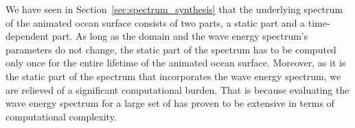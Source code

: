 %
We have seen in Section~\ref{sec:spectrum_synthesis} that the underlying
spectrum of the animated ocean surface consists of two parts, a static part
and a time-dependent part.
As long as the \wavevector domain and the wave energy spectrum's parameters do
not change, the static part of the spectrum has to be computed only once for
the entire lifetime of the animated ocean surface.
Moreover, as it is the static part of the spectrum that incorporates the wave
energy spectrum, we are relieved of a significant computational burden.
That is because evaluating the wave energy spectrum for a large set of
\wavevectors has proven to be extensive in terms of computational complexity.
%
